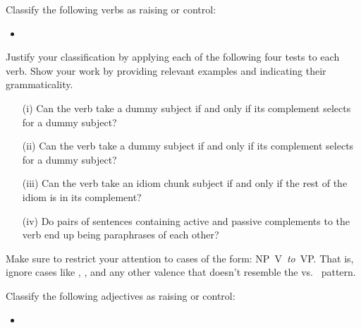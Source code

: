 \documentclass[a4paper,landscape,headrule,footrule]{foils}
\begin{document}

\noindent Classify the following verbs as raising or control:

\begin{itemize}
\item {}
\end{itemize}

\noindent
Justify your classification by applying each of the following four
tests to each verb.  Show your work by providing relevant examples
and indicating their grammaticality. 

\begin{itemize} 
\item[(i)] Can the verb take a  dummy  subject if and only if its complement selects for a dummy  subject?

\item[(ii)] Can the verb take a dummy  subject if and only if
  its complement selects for a dummy  subject?

\item[(iii)] Can the verb take an idiom chunk subject if and only
if the rest of the idiom is in its complement?

\item[(iv)] Do pairs of sentences containing active and 
passive complements to the verb end up being  paraphrases 
of each other?
\end{itemize}

\noindent
Make sure to restrict your attention to cases of the form: \hbox{NP V
  {\it to} VP}. That is, ignore cases like ,
, and any other valence that doesn't resemble
the  vs.\  pattern.

Classify the following adjectives as raising or 
control:

\begin{itemize}
\item {}
\end{itemize}
\end{document}
